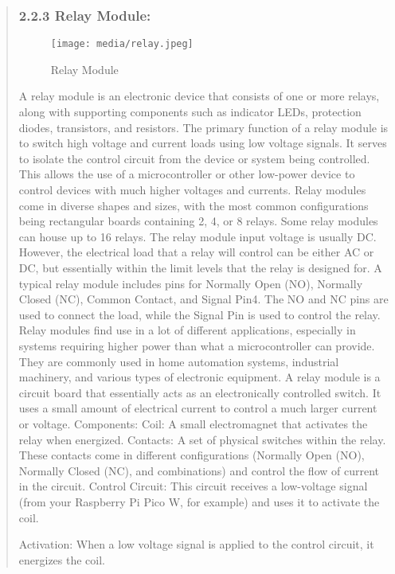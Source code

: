 \documentclass[12pt]{report}
\begin{document}
			
				\begin{quote}
				\subsubsection{2.2.3 Relay Module:}
				\begin{figure}[htbp]
					\centering
					\texttt{[image: media/relay.jpeg]}
					\caption{Relay Module}
				\end{figure}
				A relay module is an electronic device that consists of one or more relays, along with supporting components such as indicator LEDs, protection diodes, transistors, and resistors. The primary function of a relay module is to switch high voltage and current loads using low voltage signals. It serves to isolate the control circuit from the device or system being controlled. This allows the use of a microcontroller or other low-power device to control devices with much higher voltages and currents. Relay modules come in diverse shapes and sizes, with the most common configurations being rectangular boards containing 2, 4, or 8 relays. Some relay modules can house up to 16 relays. The relay module input voltage is usually DC. However, the electrical load that a relay will control can be either AC or DC, but essentially within the limit levels that the relay is designed for. A typical relay module includes pins for Normally Open (NO), Normally Closed (NC), Common Contact, and Signal Pin4. The NO and NC pins are used to connect the load, while the Signal Pin is used to control the relay. Relay modules find use in a lot of different applications, especially in systems requiring higher power than what a microcontroller can provide. They are commonly used in home automation systems, industrial machinery, and various types of electronic equipment.
				A relay module is a circuit board that essentially acts as an electronically controlled switch. It uses a small amount of electrical current to control a much larger current or voltage. 
				Components:
				Coil: A small electromagnet that activates the relay when energized.
				Contacts: A set of physical switches within the relay. These contacts come in different configurations (Normally Open (NO), Normally Closed (NC), and combinations) and control the flow of current in the circuit.
				Control Circuit: This circuit receives a low-voltage signal (from your Raspberry Pi Pico W, for example) and uses it to activate the coil.
				
				Activation: When a low voltage signal is applied to the control circuit, it energizes the coil.
				

\end{quote}
\end{document}

